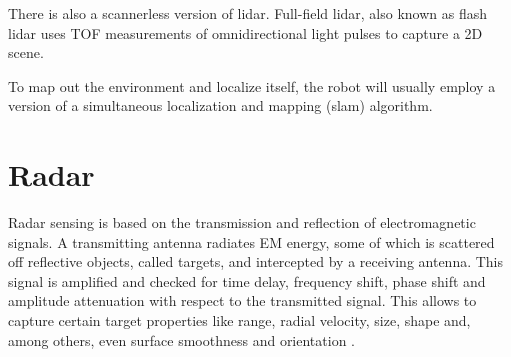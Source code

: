 There is also a scannerless version of lidar. Full-field lidar, also
known as flash lidar \cite{Payne2008} uses TOF measurements of
omnidirectional light pulses to capture a 2D scene.

To map out the environment and localize itself, the robot will usually
employ a version of a simultaneous localization and mapping (slam)
algorithm\cite{Cadena2016}.

\section{Radar}\label{radar}

Radar sensing is based on the transmission and reflection of
electromagnetic signals. A transmitting antenna radiates EM energy, some
of which is scattered off reflective objects, called targets, and
intercepted by a receiving antenna. This signal is amplified and checked
for time delay, frequency shift, phase shift and amplitude attenuation
with respect to the transmitted signal. This allows to capture certain
target properties like range, radial velocity, size, shape and, among
others, even surface smoothness and orientation \cite{Skolnik2008}.

